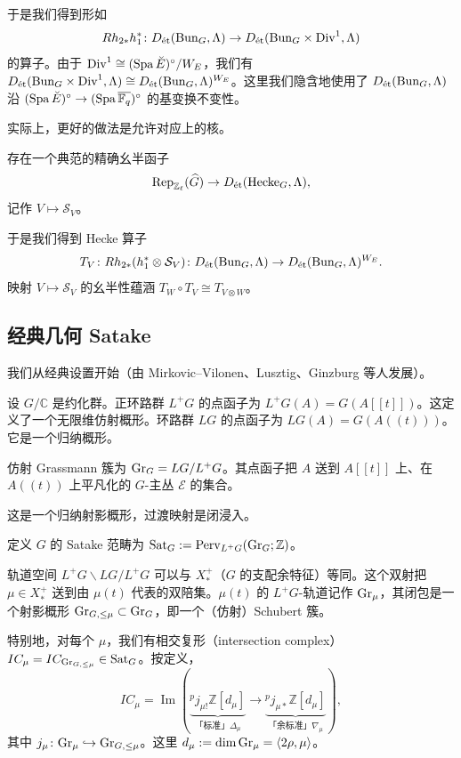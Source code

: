 
于是我们得到形如
\[
Rh_{2*}h_1^*\colon D_{\text{ét}}(\mathrm{Bun}_G,\Lambda)\to D_{\text{ét}}(\mathrm{Bun}_G\times\mathrm{Div}^1,\Lambda)
\]
的算子。由于 $\mathrm{Div}^1\cong(\operatorname{Spa}\breve{E})^\circ/W_E$，我们有 $D_{\text{ét}}(\mathrm{Bun}_G\times\mathrm{Div}^1,\Lambda)\cong D_{\text{ét}}(\mathrm{Bun}_G,\Lambda)^{W_E}$。这里我们隐含地使用了 $D_{\text{ét}}(\mathrm{Bun}_G,\Lambda)$ 沿 $(\operatorname{Spa}\breve{E})^\circ\to(\operatorname{Spa}\overline{\mathbb{F}_q})^\circ$ 的基变换不变性。

实际上，更好的做法是允许对应上的核。

\begin{theorem}
存在一个典范的精确幺半函子
\[
\operatorname{Rep}_{\mathbb Z_\ell}(\widehat G)\to D_{\text{ét}}(\mathrm{Hecke}_G,\Lambda),
\]
记作 $V\mapsto\mathcal S_V$。
\end{theorem}

于是我们得到 Hecke 算子
\[
T_V\colon Rh_{2*}(h_1^*\otimes\mathcal S_V)\colon D_{\text{ét}}(\mathrm{Bun}_G,\Lambda)\to D_{\text{ét}}(\mathrm{Bun}_G,\Lambda)^{W_E}.
\]
映射 $V\mapsto\mathcal S_V$ 的幺半性蕴涵 $T_W\circ T_V\cong T_{V\otimes W}$。

\subsection{经典几何 Satake}

我们从经典设置开始（由 Mirkovic–Vilonen、Lusztig、Ginzburg 等人发展）。

设 $G/\mathbb C$ 是约化群。正环路群 $L^+G$ 的点函子为 $L^+G(A)=G(A[[t]])$。这定义了一个无限维仿射概形。环路群 $LG$ 的点函子为 $LG(A)=G(A((t)))$。它是一个归纳概形。

\begin{definition}
仿射 Grassmann 簇为 $\mathrm{Gr}_G=LG/L^+G$。其点函子把 $A$ 送到 $A[[t]]$ 上、在 $A((t))$ 上平凡化的 $G$-主丛 $\mathcal E$ 的集合。
\end{definition}

这是一个归纳射影概形，过渡映射是闭浸入。

\begin{definition}
定义 $G$ 的 Satake 范畴为 $\mathrm{Sat}_G:=\operatorname{Perv}_{L^+G}(\mathrm{Gr}_G;\mathbb Z)$。
\end{definition}

轨道空间 $L^+G\backslash LG/L^+G$ 可以与 $X_*^+$（$G$ 的支配余特征）等同。这个双射把 $\mu\in X_*^+$ 送到由 $\mu(t)$ 代表的双陪集。$\mu(t)$ 的 $L^+G$-轨道记作 $\mathrm{Gr}_\mu$，其闭包是一个射影概形 $\mathrm{Gr}_{G,\le\mu}\subset\mathrm{Gr}_G$，即一个（仿射）Schubert 簇。

特别地，对每个 $\mu$，我们有相交复形（intersection complex）$IC_\mu=IC_{\mathrm{Gr}_{G,\le\mu}}\in\mathrm{Sat}_G$。按定义，
\[
IC_\mu=\operatorname{Im}\left(
\underbrace{{}^p j_{\mu!}\mathbb Z[d_\mu]}_{\text{「标准」}\Delta_\mu}
\to
\underbrace{{}^p j_{\mu*}\mathbb Z[d_\mu]}_{\text{「余标准」}\nabla_\mu}
\right),
\]
其中 $j_\mu\colon\mathrm{Gr}_\mu\hookrightarrow\mathrm{Gr}_{G,\le\mu}$。这里 $d_\mu:=\dim\mathrm{Gr}_\mu=\langle 2\rho,\mu\rangle$。

